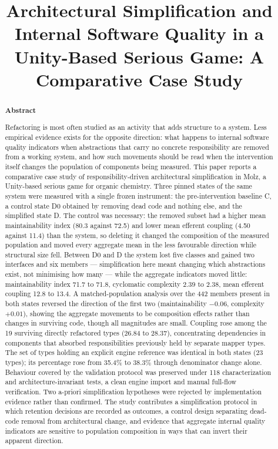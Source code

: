 \documentclass{sbc2019}%
\title[Architectural Simplification and Internal Software Quality]{Architectural Simplification and Internal Software Quality in a Unity-Based Serious Game: A Comparative Case Study}
\author[Rezende and Rocha 2026]{\affil{\textbf{Jo\~ao Guilherme Benjamin Alves de Rezende}\quad[~\textbf{Universidade Federal do Agreste de Pernambuco~}|\href{mailto:benj7100@gmail.com}{~\textbf{\textit{benj7100@gmail.com}}} ]}

\affil{\textbf{Rodrigo Gusm\~ao de Carvalho Rocha}\quad[~\textbf{Universidade Federal do Agreste de Pernambuco~}|\href{mailto:rodrigo.rocha@ufape.edu.br}{~\textbf{\textit{rodrigo.rocha@ufape.edu.br}}} ]}
}
\begin{document}
\begin{frontmatter}
\maketitle

\begin{abstract}
\textbf{Abstract}

Refactoring is most often studied as an activity that adds structure to a system. Less empirical evidence exists for the opposite direction: what happens to internal software quality indicators when abstractions that carry no concrete responsibility are removed from a working system, and how such movements should be read when the intervention itself changes the population of components being measured. This paper reports a comparative case study of responsibility-driven architectural simplification in Molz, a Unity-based serious game for organic chemistry. Three pinned states of the same system were measured with a single frozen instrument: the pre-intervention baseline C, a control state D0 obtained by removing dead code and nothing else, and the simplified state D. The control was necessary: the removed subset had a higher mean maintainability index (80.3 against 72.5) and lower mean efferent coupling (4.50 against 11.4) than the system, so deleting it changed the composition of the measured population and moved every aggregate mean in the less favourable direction while structural size fell. Between D0 and D the system lost five classes and gained two interfaces and six members --- simplification here meant changing which abstractions exist, not minimising how many --- while the aggregate indicators moved little: maintainability index 71.7 to 71.8, cyclomatic complexity 2.39 to 2.38, mean efferent coupling 12.8 to 13.4. A matched-population analysis over the 442 members present in both states reversed the direction of the first two (maintainability $-0.06$, complexity $+0.01$), showing the aggregate movements to be composition effects rather than changes in surviving code, though all magnitudes are small. Coupling rose among the 19 surviving directly refactored types (26.84 to 28.37), concentrating dependencies in components that absorbed responsibilities previously held by separate mapper types. The set of types holding an explicit engine reference was identical in both states (23 types); its percentage rose from 35.4\% to 38.3\% through denominator change alone. Behaviour covered by the validation protocol was preserved under 118 characterization and architecture-invariant tests, a clean engine import and manual full-flow verification. Two a-priori simplification hypotheses were rejected by implementation evidence rather than confirmed. The study contributes a simplification protocol in which retention decisions are recorded as outcomes, a control design separating dead-code removal from architectural change, and evidence that aggregate internal quality indicators are sensitive to population composition in ways that can invert their apparent direction.
\end{abstract}


\end{frontmatter}
\end{document}
